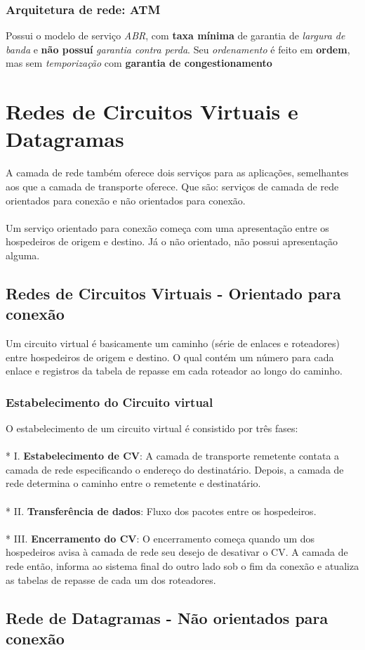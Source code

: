 \documentclass[a4paper, 12pt]{article}
\begin{document}
    \subsubsection{Arquitetura de rede: ATM}
    Possui o modelo de serviço \textit{ABR}, com \textbf{taxa mínima} de garantia de \textit{largura de banda} e \textbf{não possuí} 
    \textit{garantia contra perda}.
    Seu \textit{ordenamento} é feito em \textbf{ordem}, mas sem \textit{temporização} com \textbf{garantia de congestionamento} 

\newpage
\section{Redes de Circuitos Virtuais e Datagramas}
A camada de rede também oferece dois serviços para as aplicações, semelhantes aos que a camada de transporte oferece. Que são: serviços 
de camada de rede orientados para conexão e não orientados para conexão.
\\
\\
Um serviço orientado para conexão começa com uma apresentação entre os hospedeiros de origem e destino. Já o não orientado, não possui 
apresentação alguma.
\subsection{Redes de Circuitos Virtuais - Orientado para conexão}
Um circuito virtual é basicamente um caminho (série de enlaces e roteadores) entre hospedeiros de origem e destino. O qual contém
um número para cada enlace e registros da tabela de repasse em cada roteador ao longo do caminho.

    \subsubsection{Estabelecimento do Circuito virtual}
    O estabelecimento de um circuito virtual é consistido por três fases:
        \\
        \\*
        I. \textbf{Estabelecimento de CV}: A camada de transporte remetente contata a camada de rede especificando o endereço do destinatário.
        Depois, a camada de rede determina o caminho entre o remetente e destinatário.
        \\
        \\*
        II. \textbf{Transferência de dados}: Fluxo dos pacotes entre os hospedeiros.
        \\
        \\*
        III. \textbf{Encerramento do CV}: O encerramento começa quando um dos hospedeiros avisa à camada de rede seu desejo de desativar o CV.
        A camada de rede então, informa ao sistema final do outro lado sob o fim da conexão e atualiza as tabelas de repasse de cada um dos
        roteadores.

\subsection{Rede de Datagramas - Não orientados para conexão}
\end{document}
